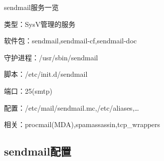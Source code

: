 \begin{frame}{sendmail服务一览}

类型：SysV管理的服务

软件包：sendmail,sendmail-cf,sendmail-doc

守护进程：/usr/sbin/sendmail

脚本：/etc/init.d/sendmail

端口：25(smtp)

配置：/etc/mail/sendmail.mc,/etc/aliases,\ldots{}

相关：procmail(MDA),spamassassin,tcp\_wrappers


\end{frame} 
\subsection{sendmail配置}


